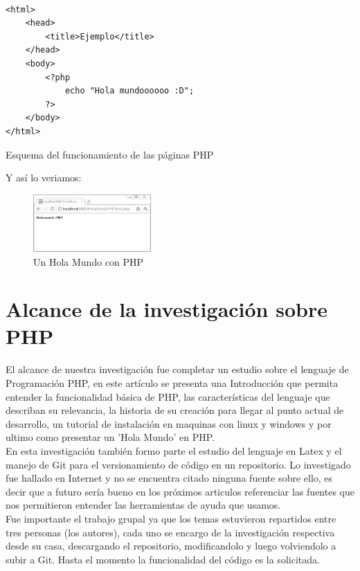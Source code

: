 \documentclass[11pt]{article} %
\begin{document}
\begin{lstlisting}[frame=single]  % Start your code-block

<html>
    <head>
        <title>Ejemplo</title>
    </head>
    <body>
        <?php
            echo "Hola mundoooooo :D";
        ?>
    </body>
</html>
\end{lstlisting}
\begin{center}
Esquema del funcionamiento de las páginas PHP \cite{[2]}
\end{center}
Y así lo veriamos:
\begin{figure}[H]
  \centering
    \includegraphics[width=0.4\textwidth]{Imagenes/HolaMundoPHP-Navegador}
  \caption{Un Hola Mundo con PHP}
  \label{fig:funcionamiento}
\end{figure}

\section{Alcance de la investigación sobre PHP}
El alcance de nuestra investigación fue completar un estudio sobre el lenguaje de Programación PHP, en este artículo se presenta una Introducción que permita entender la funcionalidad básica de PHP, las características del lenguaje que describan su relevancia, la historia de su creación para llegar al punto actual de desarrollo, un tutorial de instalación en maquinas con linux y windows y por ultimo como presentar un 'Hola Mundo' en PHP.\\
En esta investigación también formo parte el estudio del lenguaje en Latex y el manejo de Git para el versionamiento de código en un repositorio. Lo investigado fue hallado en Internet y no se encuentra citado ninguna fuente sobre ello, es decir que a futuro sería bueno en los próximos articulos referenciar las fuentes que nos permitieron entender las herramientas de ayuda que usamos.\\
Fue importante el trabajo grupal ya que los temas estuvieron repartidos entre tres personas (los autores), cada uno se encargo de la investigación respectiva desde su casa, descargando el repositorio, modificandolo y luego volviendolo a subir a Git. 
Hasta el momento la funcionalidad del código es la solicitada. 
\end{document}
